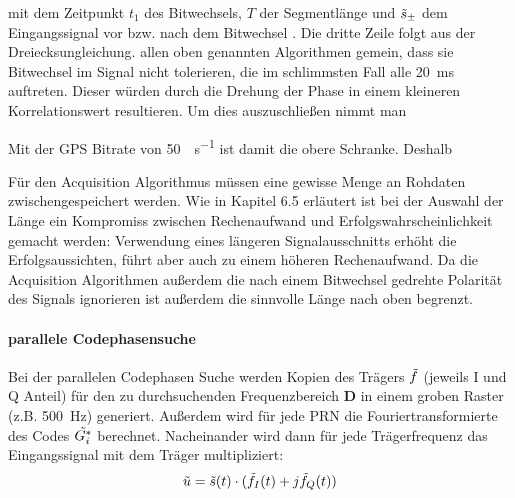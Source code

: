 mit dem Zeitpunkt $t_1$ des Bitwechsels, $T$ der Segmentlänge und $\tilde{s}_{\pm}$ dem Eingangssignal vor bzw. nach dem Bitwechsel . Die dritte Zeile folgt aus der Dreiecksungleichung.
allen oben genannten Algorithmen gemein, dass sie Bitwechsel im Signal nicht tolerieren, die im schlimmsten Fall alle  \SI{20}{\milli\second} auftreten. Dieser würden durch die Drehung der Phase in einem kleineren Korrelationswert resultieren. Um dies auszuschließen nimmt man 

Mit der GPS Bitrate von \SI{50}{\bit\per\second} ist damit die obere Schranke. Deshalb

Für den Acquisition Algorithmus müssen eine gewisse Menge an Rohdaten zwischengespeichert werden. Wie in \cite{borre2007software} Kapitel 6.5 erläutert ist bei der Auswahl der Länge ein Kompromiss zwischen Rechenaufwand und Erfolgswahrscheinlichkeit gemacht werden: Verwendung eines längeren Signalausschnitts erhöht die Erfolgsaussichten, führt aber auch zu einem höheren Rechenaufwand. Da die Acquisition Algorithmen außerdem die nach einem Bitwechsel gedrehte Polarität des Signals ignorieren ist außerdem die sinnvolle Länge nach oben begrenzt.




\paragraph{parallele Codephasensuche}
Bei der parallelen Codephasen Suche werden Kopien des Trägers $\tilde{f}$ (jeweils I und Q Anteil) für den zu durchsuchenden Frequenzbereich $\textbf{D}$ in einem groben Raster (z.B. \SI{500}{\Hz}) generiert. Außerdem wird für jede PRN die Fouriertransformierte des Codes $\tilde{G_i^*}$ berechnet. Nacheinander wird dann für jede Trägerfrequenz das Eingangssignal mit dem Träger multipliziert:
\begin{equation}
	\tilde{u}=\tilde{s}(t) \cdot (\tilde{f}_I(t) + j \tilde{f}_Q(t))
\end{equation}

